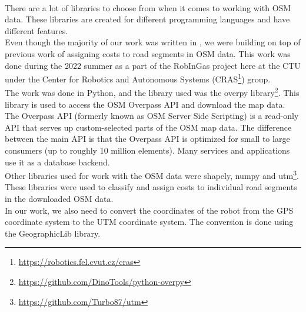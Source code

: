    \\
        There are a lot of libraries to choose from when it comes to working with OSM data. These libraries are created for different programming languages and have different features.\\
        Even though the majority of our work was written in \CC, we were building on top of previous work of assigning costs to road segments in OSM data. This work was done during the 2022 summer as a part of the RobInGas project here at the CTU under the Center for Robotics and Autonomous Systems (CRAS\footnote{\url{https://robotics.fel.cvut.cz/cras}}) group.\\
        The work was done in Python, and the library used was the overpy library\footnote{\url{https://github.com/DinoTools/python-overpy}}. This library is used to access the OSM Overpass API and download the map data. The Overpass API (formerly known as OSM Server Side Scripting) is a read-only API that serves up custom-selected parts of the OSM map data. The difference between the main API is that the Overpass API is optimized for small to large consumers (up to roughly 10 million elements). Many services and applications use it as a database backend.\cite{Overpass}\\
        Other libraries used for work with the OSM data were shapely\cite{shapely}, numpy\cite{numpy} and utm\footnote{\url{https://github.com/Turbo87/utm}}. These libraries were used to classify and assign costs to individual road segments in the downloaded OSM data.\\
        In our work, we also need to convert the coordinates of the robot from the GPS coordinate system to the UTM coordinate system. The conversion is done using the GeographicLib library\cite{GeographicLib}.